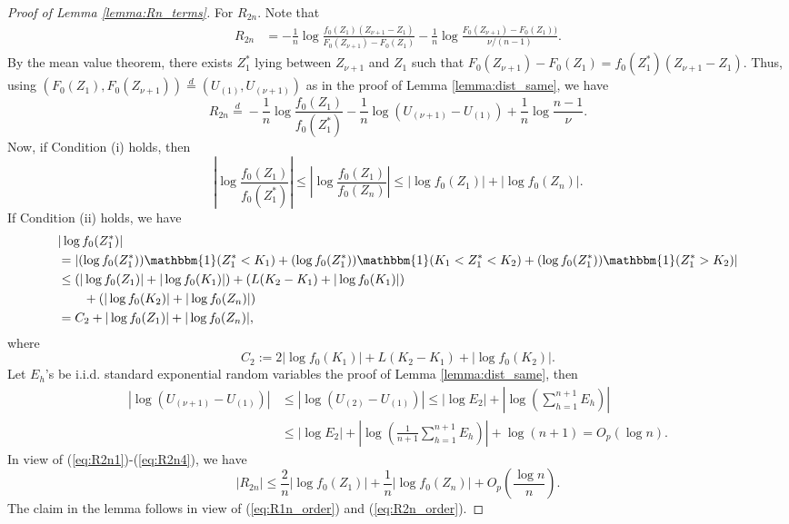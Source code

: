 \documentclass[10pt,a4paper]{amsart}
\begin{document}
\begin{proof}[Proof of Lemma \ref{lemma:Rn_terms}]
  For $R_{2n}$. Note that
\begin{align*}
	R_{2n} &= -\frac{1}{n} \log \frac{f_0(Z_1)(Z_{\nu+1} - Z_1)}{F_0(Z_{\nu+1})- F_0(Z_1)} - \frac{1}{n}\log \frac{F_0(Z_{\nu+1}) - F_0(Z_1))}{\nu/(n-1)}.
\end{align*}
By the mean value theorem, there exists $Z^*_1$ lying between $Z_{\nu+1}$ and $Z_1$ such that $F_0(Z_{\nu+1}) - F_0(Z_1) = f_0(Z^*_1)(Z_{\nu+1}-Z_1)$. Thus, using $(F_0(Z_1), F_0(Z_{\nu+1})) \stackrel{d}{=} (U_{(1)}, U_{(\nu+1)}) $ as in the proof of Lemma \ref{lemma:dist_same}, we have
\begin{equation}\label{eq:R2n1}
	R_{2n} \stackrel{d}{=}  -\frac{1}{n}\log \frac{f_0(Z_1)}{f_0(Z^*_1)} - \frac{1}{n} \log (U_{(\nu+1)} - U_{(1)}) + \frac{1}{n} \log \frac{n-1}{\nu}.
\end{equation}
Now, if Condition (i) holds, then 
\begin{equation}\label{eq:R2n2}
\left|	\log \frac{f_0(Z_1)}{f_0(Z^*_1)} \right| \leq \left|	\log \frac{f_0(Z_1)}{f_0(Z_n)} \right| \leq |\log f_0(Z_1)|+ |\log f_0(Z_n)|.
\end{equation}
If Condition (ii) holds, we have
\begin{align}
&	|\log f_0(Z^*_1)| \nonumber\\
 &= |(\log f_0(Z^*_1))\mathbbm{1}(Z^*_1 < K_1)  +
	(\log f_0(Z^*_1))\mathbbm{1}(K_1 < Z^*_1 < K_2) + (\log f_0(Z^*_1))\mathbbm{1}(Z^*_1 > K_2)| \nonumber \\
	& \leq (|\log f_0(Z_1)| + |\log f_0(K_1)|) + (L(K_2 - K_1) + |\log f_0(K_1)|) \nonumber \\
	& \quad \quad  + (|\log f_0(K_2)| + |\log f_0(Z_n)|)  \nonumber \\
	& =C_2 + |\log f_0(Z_1)| + |\log f_0(Z_n)|, \label{eq:R2n3}
\end{align}
where
\begin{equation*}
	C_2:= 2 |\log f_0(K_1)| + L(K_2-K_1) + |\log f_0(K_2)|.
\end{equation*}
Let $E_h$'s be i.i.d. standard exponential random variables the proof of Lemma \ref{lemma:dist_same}, then
\begin{align}
	|\log (U_{(\nu+1)} - U_{(1)})| & \leq |\log (U_{(2)} - U_{(1)})| \leq |\log E_2| + \left| \log \left( \sum^{n+1}_{h=1} E_h\right)\right|\nonumber\\
 &\leq |\log E_2| + \left| \log \left( \frac{1}{n+1}\sum^{n+1}_{h=1} E_h\right) \right|  + \log (n+1)= O_p(\log n).  \label{eq:R2n4}
\end{align}
In view of (\ref{eq:R2n1})-(\ref{eq:R2n4}), we have
\begin{equation}\label{eq:R2n_order}
\left|	R_{2n }\right| \leq \frac{2}{n} |\log f_0(Z_1)| + \frac{1}{n}|\log f_0(Z_n)| + O_p\left(\frac{\log n}{n}\right).
\end{equation}
The claim in the lemma follows in view of (\ref{eq:R1n_order}) and (\ref{eq:R2n_order}).
\end{proof}
\end{document}
